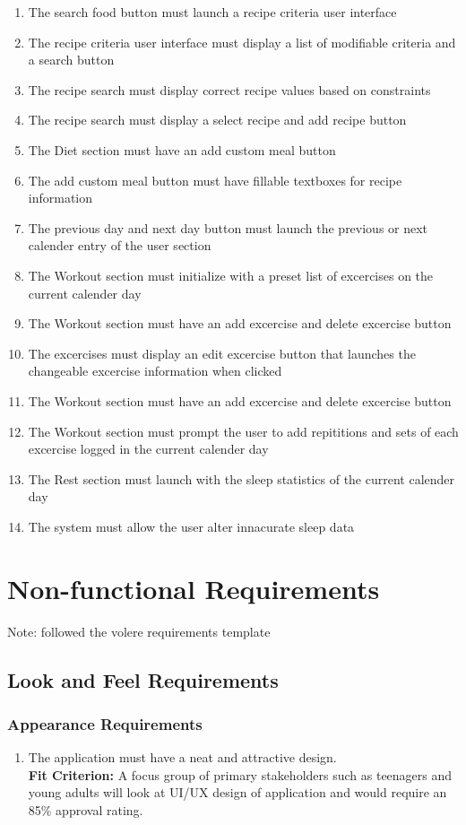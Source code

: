 \documentclass[12pt,letterpaper]{article}
\begin{document}
\begin{enumerate}[{FR}1.]
\item  The search food button must launch a recipe criteria user interface
\item  The recipe criteria user interface must display a list of modifiable criteria and a search button
\item  The recipe search must display correct recipe values based on constraints
\item  The recipe search must display a select recipe and add recipe button
\item  The Diet section must have an add custom meal button
\item  The add custom meal button must have fillable textboxes for recipe information
\item  The previous day and next day button must launch the previous or next calender entry of the user section
\item  The Workout section must initialize with a preset list of excercises on the current calender day
\item  The Workout section must have an add excercise and delete excercise button
\item  The excercises must display an edit excercise button that launches the changeable excercise information when clicked
\item  The Workout section must have an add excercise and delete excercise button
\item  The Workout section must prompt the user to add repititions and sets of each excercise logged in the current calender day
\item  The Rest section must launch with the sleep statistics of the current calender day
\item  The system must allow the user alter innacurate sleep data
\end{enumerate}

\section{Non-functional Requirements}
\noindent Note: followed the volere requirements template

\subsection{Look and Feel Requirements}
\subsubsection{Appearance Requirements}
\begin{enumerate}[{LF}1.] 
    \item The application must have a neat and attractive design.\\
    {\textbf{Fit Criterion:} A focus group of primary stakeholders such as teenagers and young adults will look at UI/UX design of application and would require an 85\% approval rating.}
\end{enumerate}
\end{document}
